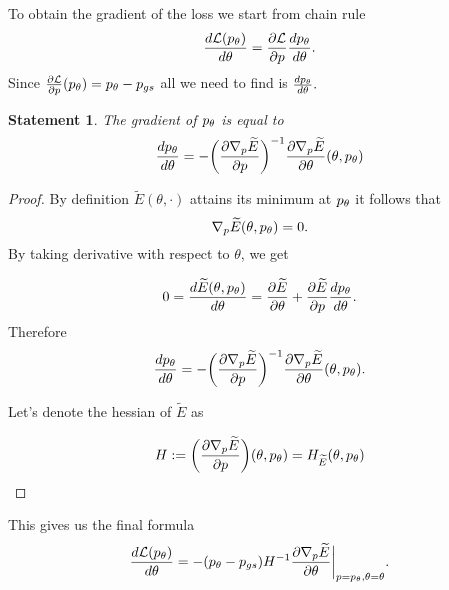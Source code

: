 \documentclass[a4paper,10pt]{report}
\newtheorem{statement}{Statement}
\begin{document}
To obtain the gradient of the loss we start from chain rule
\begin{equation}
 \frac{d\mathcal{L}(p_\theta)}{d \theta} = \frac{\partial \mathcal{L}}{\partial p}\frac{dp_\theta}{d \theta}.
\end{equation}
Since $\frac{\partial \mathcal{L}}{\partial p}(p_\theta )= p_\theta-p_{gs}$ all we need to find is $\frac{dp_\theta}{d \theta}.$

\begin{statement}
The gradient of $p_\theta$ is equal to
 \begin{equation}
   \frac{dp_\theta}{d \theta} = -\bigg(\frac{\partial \nabla_p \widetilde{E}}{\partial p}\bigg)^{-1} \frac{\partial \nabla_p \widetilde{E}}{\partial \theta}(\theta, p_\theta)
 \end{equation}
\end{statement}

\begin{proof}
By definition $\widetilde{E}(\theta, \cdot)$ attains its minimum at $p_\theta$ it follows that
\begin{equation}
 \nabla_p \widetilde{E}(\theta, p_\theta) = 0.
\end{equation}
By taking derivative with respect to $\theta$, we get


\begin{equation}
0=\frac{d\widetilde{E}(\theta, p_\theta)}{d \theta} = \frac{\partial \widetilde{E}}{\partial \theta} + \frac{\partial \widetilde{E}}{\partial p} \frac{dp_\theta}{d \theta}.
\end{equation}
Therefore
\begin{equation}
 \frac{dp_\theta}{d \theta} = -\bigg(\frac{\partial \nabla_p \widetilde{E}}{\partial p}\bigg)^{-1} \frac{\partial \nabla_p \widetilde{E}}{\partial \theta}(\theta, p_\theta).
\end{equation}

Let's denote the hessian of $\widetilde{E}$ as

\begin{equation}
 H := \bigg(\frac{\partial \nabla_p \widetilde{E}}{\partial p}\bigg)(\theta,p_\theta) = H_{\widetilde{E}}(\theta,p_\theta)
\end{equation}
\end{proof}
This gives us the final formula
\begin{equation}
 \frac{d\mathcal{L}(p_\theta)}{d \theta} = - (p_\theta - p_{gs}) H^{-1}  \frac{\partial \nabla_p \widetilde{E}}{\partial \theta}\bigg|_{p=p_\theta, \theta=\theta}.
\end{equation}


\end{document}
